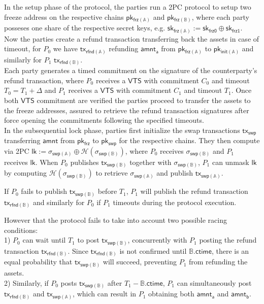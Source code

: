 \documentclass{article}      	%
\begin{document}
In the setup phase of the protocol, the parties run a 2PC protocol to setup two freeze address on the respective chains $\mathsf{pk_{frz(\mathbb{A})}}$ and $\mathsf{pk_{frz(\mathbb{B})}}$, where each party posseses one share of the respective secret keys, e.g. $\mathsf{sk_{frz(\mathbb{A})}} := \mathsf{sk_{frz0}} \oplus  \mathsf{sk_{frz1}}$. \\
Now the parties create a refund transaction transferring back the assets in case of timeout, for $P_0$ we have $\mathsf{tx_{rfnd(\mathbb{A})}}$ refunding $\mathsf{amnt_a}$ from $\mathsf{pk_{frz(\mathbb{A})}}$ to $\mathsf{pk_{init(\mathbb{A})}}$ and similarly for $P_1$ $\mathsf{tx_{rfnd(\mathbb{B})}}$. \\
Each party generates a timed commitment on the signature of the counterparty's refund transaction, where $P_0$ receives a $\mathsf{VTS}$ with commitment $C_0$ and timeout $T_0 = T_1 + \Delta$ and $P_1$ receives a $\mathsf{VTS}$ with commitment $C_1$ and timeout $T_1$. Once both $\mathsf{VTS}$ commitment are verified the parties proceed to transfer the assets to the freeze addresses, assured to retrieve the refund transaction signatures after force opening the commitments following the specified timeouts. \\

In the subsequential lock phase, parties first initialize the swap transactions $\mathsf{tx_{swp}}$ transferring $\mathsf{amnt}$ from $\mathsf{pk_{frz}}$ to $\mathsf{pk_{swp}}$ for the respective chains. They then compute via 2PC $\mathsf{lk} := \sigma_{\mathsf{swp}(\mathbb{A})} \oplus \mathcal{H}(\sigma_{\mathsf{swp}(\mathbb{B})})$, where  $P_0$ receives $\sigma_{\mathsf{swp}(\mathbb{B})}$ and $P_1$ receives $\mathsf{lk}$.  When $P_0$ publishes $\mathsf{tx_{swp(\mathbb{B})}}$ together with  $\sigma_{\mathsf{swp}(\mathbb{B})}$, $P_1$ can unmask $\mathsf{lk}$ by computing $\mathcal{H}(\sigma_{\mathsf{swp}(\mathbb{B})})$ to retrieve $\sigma_{\mathsf{swp}(\mathbb{A})}$ and publish $\mathsf{tx_{swp(\mathbb{A})}}$.

 If $P_0$ fails to publish $\mathsf{tx_{swp(\mathbb{B})}}$ before $T_1$, $P_1$ will publish the refund transaction $\mathsf{tx_{rfnd(\mathbb{B})}}$ and similarly for $P_0$ if $P_1$ timeouts during the protocol execution.

However that the protocol fails to take into account two possible racing conditions: \\
1) $P_0$ can wait until $T_1$ to post $\mathsf{tx_{swp(\mathbb{B})}}$, concurrently with $P_1$ posting the refund transaction $\mathsf{tx_{rfnd(\mathbb{B})}}$. Since $\mathsf{tx_{rfnd(\mathbb{B})}}$ is not confirmed until $\mathbb{B}.\mathsf{ctime}$, there is an equal probability that $\mathsf{tx_{swp(\mathbb{B})}}$ will succeed, preventing $P_1$ from refunding the assets. \\ 
2) Similarly, if $P_0$ posts $\mathsf{tx_{swp(\mathbb{B})}}$ after $T_1 - \mathbb{B}.\mathsf{ctime}$, $P_1$ can simultaneously post $\mathsf{tx_{rfnd(\mathbb{B})}}$ and $\mathsf{tx_{swp(\mathbb{A})}}$, which can result in $P_1$ obtaining both $\mathsf{amnt_a}$ and $\mathsf{amnt_b}$. \\
\end{document}
